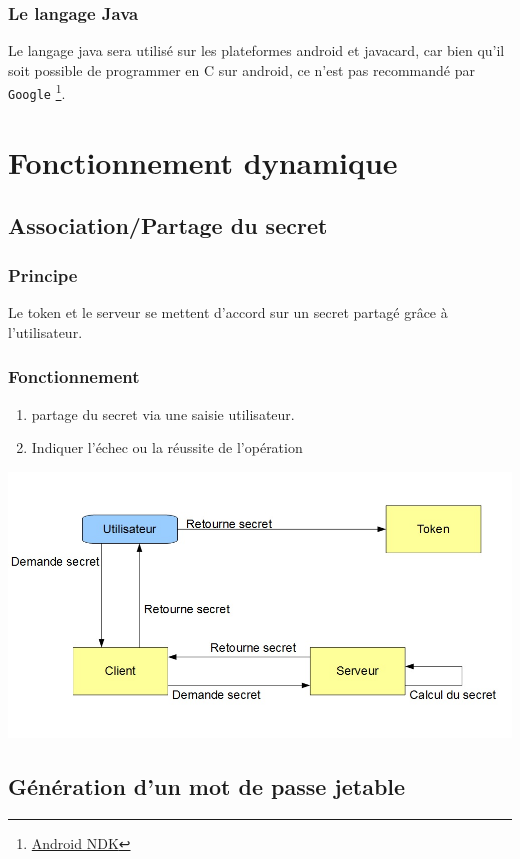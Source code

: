 \documentclass{"../../res/univ-projet"}
\begin{document}
\subsubsection{Le langage Java}
    Le langage java sera utilis\'e sur les plateformes android
    et javacard, car bien qu'il soit possible de programmer en C
    sur android, ce n'est pas recommand\'e par \verb?Google?
    \footnote{\href{https://developer.android.com/tools/sdk/ndk/index.html}{Android NDK}}.
        
\section{Fonctionnement dynamique}
\subsection{Association/Partage du secret}
\subsubsection{Principe}
Le token et le serveur se mettent d'accord sur un secret partag\'e gr\^ace à l'utilisateur.

\subsubsection{Fonctionnement}
\begin{enumerate}
    \item partage du secret via une saisie utilisateur.
    \item Indiquer l'échec ou la réussite de l'opération
\end{enumerate}
\includegraphics[width=\textwidth]{../graphics/association.jpg}

\subsection{Génération d'un mot de passe jetable}
\end{document}
